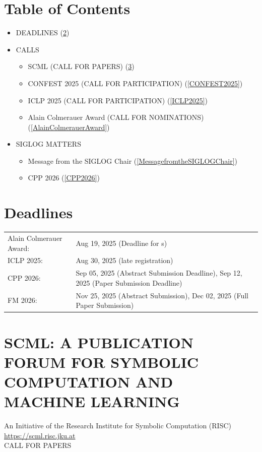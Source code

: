 \documentclass[prodmode,acmtecs]{acmsmall} %
\begin{document}
\section{Table of Contents}\begin{itemize}\item DEADLINES (\cref{deadlines}) 
 
\item CALLS 
 
\begin{itemize}\item SCML (CALL FOR PAPERS) (\cref{SCML})
\item CONFEST 2025 (CALL FOR PARTICIPATION) (\cref{CONFEST2025})
\item ICLP 2025 (CALL FOR PARTICIPATION) (\cref{ICLP2025})
\item Alain Colmerauer Award (CALL FOR NOMINATIONS) (\cref{AlainColmerauerAward})
\end{itemize} 
\item SIGLOG MATTERS 
 
\begin{itemize}\item Message from the SIGLOG Chair (\cref{MessagefromtheSIGLOGChair})
\item CPP 2026 (\cref{CPP2026})
\end{itemize} 
\end{itemize}\section{Deadlines}\label{deadlines}\begin{tabulary}{\linewidth}{LL}Alain Colmerauer Award:  & Aug 19, 2025 (Deadline for s) \\
ICLP 2025:  & Aug 30, 2025 (late registration) \\
CPP 2026:  & Sep 05, 2025 (Abstract Submission Deadline), Sep 12, 2025 (Paper Submission Deadline) \\
FM 2026:  & Nov 25, 2025 (Abstract Submission), Dec 02, 2025 (Full Paper Submission) \\
\end{tabulary}
\section{SCML: A PUBLICATION FORUM FOR SYMBOLIC COMPUTATION AND MACHINE LEARNING}\label{SCML}  An Initiative of the Research Institute for Symbolic Computation (RISC)\\ 
  \href{https://scml.risc.jku.at}{https://scml.risc.jku.at}\\ 
CALL FOR PAPERS 
\end{document}
